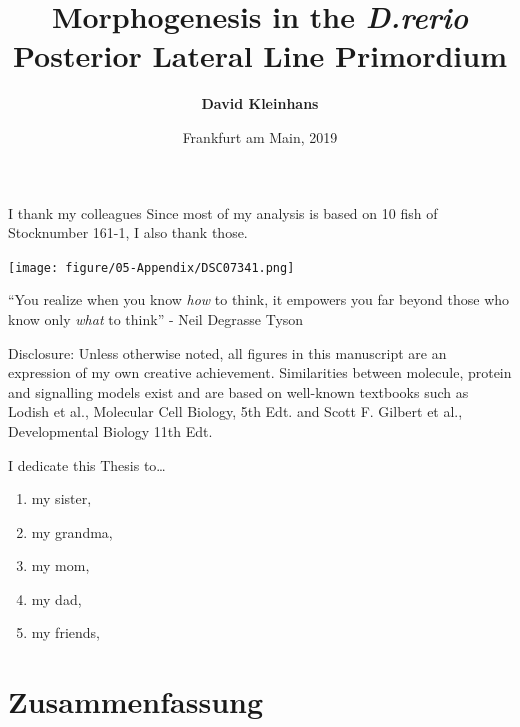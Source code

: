 \documentclass[11pt,singlespacinge,twoside]{reedthesis} %
\title{\textbf{Morphogenesis in the \emph{D.rerio} Posterior Lateral Line Primordium}}
\author{\textbf{David Kleinhans}}
\date{Frankfurt am Main, 2019}
\def\labelenumi{\arabic{enumi}.}
\begin{document}
  \maketitle

\frontmatter %
\pagestyle{empty} %
  \begin{acknowledgements}
    I thank my colleagues
    Since most of my analysis is based on 10 fish of Stocknumber 161-1, I also thank those.
\begin{center}
\texttt{[image: figure/05-Appendix/DSC07341.png]}
\end{center}
  \end{acknowledgements}
  \begin{preface}
    ``You realize when you know \emph{how} to think, it empowers you far beyond those who know only \emph{what} to think'' - Neil Degrasse Tyson
  \end{preface}
  \hypersetup{linkcolor=black}
  \setcounter{tocdepth}{2}
  \tableofcontents

  \listoftables

  \listoffigures
  {Disclosure: Unless otherwise noted, all figures in this manuscript are an expression of my own creative achievement. Similarities between molecule, protein and signalling models exist and are based on well-known textbooks such as Lodish et al., Molecular Cell Biology, 5th Edt. and Scott F. Gilbert et al., Developmental Biology 11th Edt.}

  \begin{dedication}
    I dedicate this Thesis to\ldots{}
    \begin{enumerate}
    \def\labelenumi{\arabic{enumi}.}
    \item
      my sister,
    \item
      my grandma,
    \item
      my mom,
    \item
      my dad,
    \item
      my friends,
    \end{enumerate}
  \end{dedication}
\mainmatter %
\pagestyle{fancyplain} %

\hypertarget{zusammenfassung}{%
\chapter*{Zusammenfassung}\label{zusammenfassung}}
\end{document}

